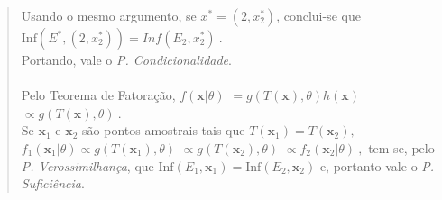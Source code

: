 \documentclass[
]{book}
\begin{document}
\begin{quote}
Usando o mesmo argumento, se \(x^*=(2,x_2^*)\), conclui-se que \(\text{Inf}\left(E^*,(2,x_2^*)\right)=Inf(E_2,x_2^*)~.\)\\
Portando, vale o \emph{P. Condicionalidade}.\\
\(~\)\\
Pelo Teorema de Fatoração, \(f(\boldsymbol x|\theta)\) \(=g\left(T(\boldsymbol x),\theta\right)h(\boldsymbol x)\) \(\propto g\left(T(\boldsymbol x),\theta\right)~.\)\\
Se \(\boldsymbol x_1\) e \(\boldsymbol x_2\) são pontos amostrais tais que \(T(\boldsymbol x_1)=T(\boldsymbol x_2),\) \(f_1(\boldsymbol x_1|\theta)\propto g\left(T(\boldsymbol x_1),\theta\right)\) \(\propto g(T(\boldsymbol x_2),\theta)\) \(\propto f_2(\boldsymbol x_2|\theta)~,\) tem-se, pelo \emph{P. Verossimilhança}, que \(\text{Inf}(E_1,\boldsymbol x_1)=\text{Inf}(E_2,\boldsymbol x_2)\) e, portanto vale o \emph{P. Suficiência}.
\end{quote}

\(~\)

\(~\)
\end{document}
